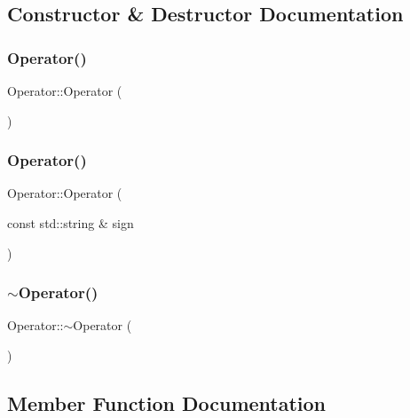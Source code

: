 \subsection{Constructor \& Destructor Documentation}
\mbox{\label{class_operator_acf2514c5e9f48b0a988c955a7d41c486}} 
\subsubsection{\texorpdfstring{Operator()}{Operator()}\hspace{0.1cm}{\footnotesize\ttfamily [1/2]}}
{\footnotesize\ttfamily Operator\+::\+Operator (\begin{DoxyParamCaption}{ }\end{DoxyParamCaption})}

\mbox{\label{class_operator_a335f2f54a53c02fbb7be1a09824c3827}} 
\subsubsection{\texorpdfstring{Operator()}{Operator()}\hspace{0.1cm}{\footnotesize\ttfamily [2/2]}}
{\footnotesize\ttfamily Operator\+::\+Operator (\begin{DoxyParamCaption}\item[{const std\+::string \&}]{sign }\end{DoxyParamCaption})}

\mbox{\label{class_operator_a2dedbf3c020736c8962f1d8d89f6cff3}} 
\subsubsection{\texorpdfstring{$\sim$Operator()}{~Operator()}}
{\footnotesize\ttfamily Operator\+::$\sim$\+Operator (\begin{DoxyParamCaption}{ }\end{DoxyParamCaption})}



\subsection{Member Function Documentation}
\mbox{\label{class_operator_a42b33776a8eebfcef38e079529c76de7}} 
